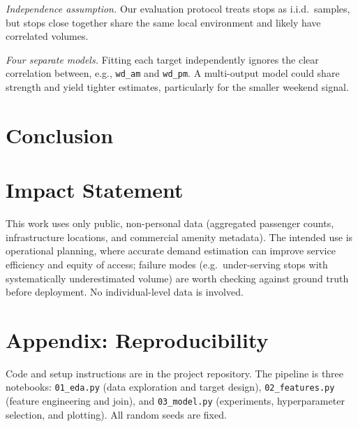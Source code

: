 \documentclass{article}
\begin{document}
\emph{Independence assumption.} Our evaluation protocol treats stops as
i.i.d.\ samples, but stops close together share the same local
environment and likely have correlated volumes.

\emph{Four separate models.} Fitting each target independently ignores
the clear correlation between, e.g., \texttt{wd\_am} and \texttt{wd\_pm}.
A multi-output model could share strength and yield tighter estimates,
particularly for the smaller weekend signal.

\section{Conclusion}
\label{sec:conclusion}

\section*{Impact Statement}

This work uses only public, non-personal data (aggregated passenger counts,
infrastructure locations, and commercial amenity metadata). The intended
use is operational planning, where accurate demand estimation can improve
service efficiency and equity of access; failure modes (e.g.\ under-serving
stops with systematically underestimated volume) are worth checking
against ground truth before deployment. No individual-level data is
involved.




\appendix
\onecolumn
\section{Appendix: Reproducibility}

Code and setup instructions are in the project repository. The pipeline is
three notebooks: \texttt{01\_eda.py} (data exploration and target
design), \texttt{02\_features.py} (feature engineering and join), and
\texttt{03\_model.py} (experiments, hyperparameter selection, and
plotting). All random seeds are fixed.
\end{document}
